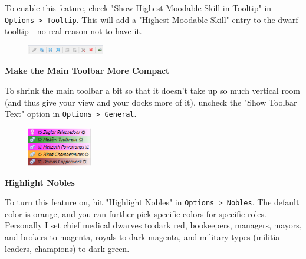\documentclass[]{article}
\begin{document}
To enable this feature, check "Show Highest Moodable Skill in Tooltip" in \texttt{Options > Tooltip}.
This will add a "Highest Moodable Skill" entry to the dwarf tooltip---no real reason not to have it.
\vspace{12pt}

\begin{figure}
\vspace{-5pt}
  \begin{center}
    \includegraphics[width=0.3\textwidth]{Sec2Fig23}
  \end{center}
\vspace{-10pt}
\end{figure}
\noindent \textbf{Make the Main Toolbar More Compact}

To shrink the main toolbar a bit so that it doesn't take up so much vertical room (and thus give your
view and your docks more of it), uncheck the "Show Toolbar Text" option in \texttt{Options > General}.
\vspace{12pt}


\begin{figure}\vspace{-20pt}
  \begin{center}
    \includegraphics[width=0.25\textwidth]{Sec2Fig25}
  \end{center}
\vspace{-15pt}
\end{figure}
\noindent \textbf{Highlight Nobles}

To turn this feature on, hit "Highlight Nobles" in \texttt{Options > Nobles}. The default color is
orange, and you can further pick specific colors for specific roles. Personally I set chief medical
dwarves to dark red, bookeepers, managers, mayors, and brokers to magenta, royals to dark magenta, and
military types (militia leaders, champions) to dark green.
\vspace{12pt}
\end{document}
